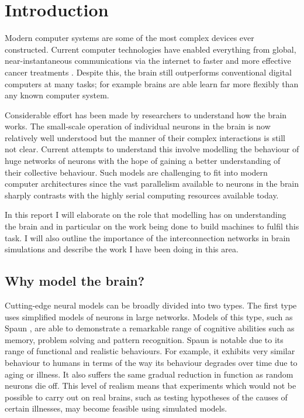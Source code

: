 \chapter{Introduction}
	
	Modern computer systems are some of the most complex devices ever constructed.
	Current computer technologies have enabled everything from global,
	near-instantaneous communications via the internet to faster and more
	effective cancer treatments \cite{nassif}. Despite this, the brain still
	outperforms conventional digital computers at many tasks; for example brains
	are able learn far more flexibly than any known computer system.
	
	Considerable effort has been made by researchers to understand how the brain
	works. The small-scale operation of individual neurons in the brain is now
	relatively well understood but the manner of their complex interactions is
	still not clear. Current attempts to understand this involve modelling the
	behaviour of huge networks of neurons with the hope of gaining a better
	understanding of their collective behaviour. Such models are challenging to
	fit into modern computer architectures since the vast parallelism available to
	neurons in the brain sharply contrasts with the highly serial computing
	resources available today.

	In this report I will elaborate on the role that modelling has on
	understanding the brain and in particular on the work being done to build
	machines to fulfil this task. I will also outline the importance of the
	interconnection networks in brain simulations and describe the work I have
	been doing in this area.
	
	\section{Why model the brain?}
	
		Cutting-edge neural models can be broadly divided into two types. The first
		type uses simplified models of neurons in large networks. Models of this
		type, such as Spaun \cite{eliasmith12}, are able to demonstrate a remarkable
		range of cognitive abilities such as memory, problem solving and pattern
		recognition. Spaun is notable due to its range of functional and realistic
		behaviours. For example, it exhibits very similar behaviour to humans in
		terms of the way its behaviour degrades over time due to aging or illness.
		It also suffers the same gradual reduction in function as random neurons die
		off. This level of realism means that experiments which would not be
		possible to carry out on real brains, such as testing hypotheses of the
		causes of certain illnesses, may become feasible using simulated models.
		

